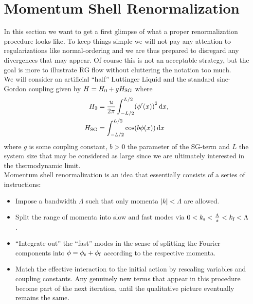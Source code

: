 \documentclass[english, parskip=full]{scrartcl}
\title{\titel}
\author{\autor}
\date{\today}
\begin{document}
\maketitle  %


\section{Momentum Shell Renormalization}
In this section we want to get a first glimpse of what a proper renormalization procedure looks like.
To keep things simple we will not pay any attention to regularizations like normal-ordering and we are thus prepared to disregard any divergences that may appear.
Of course this is not an acceptable strategy, but the goal is more to illustrate RG flow without cluttering the notation too much.\\
We will consider an artificial ``half'' Luttinger Liquid and the standard sine-Gordon coupling given by $H=H_0+g H_{\text{SG}}$ where
\begin{align}
H_0 &= \frac{u}{2\pi} \intx{-L/2}{L/2}{ \kla*{\phi'(x)}^2 }{x},\\
H_\Text{SG} &= \intx{-L/2}{L/2}{ \cos\kla*{b\phi(x)}}{x}
\end{align}
where $g$ is some coupling constant, $b>0$ the parameter of the SG-term and $L$ the system size that may be considered as large since we are ultimately interested in the thermodynamic limit.\\
Momentum shell renormalization is an idea that essentially consists of a series of instructions:
\begin{itemize}
\item[1.] Impose a bandwidth $\Lambda$ such that only momenta $|k|<\Lambda$ are allowed.
\item[2.] Split the range of momenta into slow and fast modes via $0<k_{\text{s}} < \frac{\Lambda}{s} < k_{\text{f}} < \Lambda$.
\item[3.] ``Integrate out'' the ``fast'' modes in the sense of splitting the Fourier components into $\phi = \phi_{\text{s}} + \phi_{\text{f}}$ according to the respective momenta.
\item[4.] Match the effective interaction to the initial action by rescaling variables and coupling constants. Any genuinely new terms that appear in this procedure become part of the next iteration, until the qualitative picture eventually remains the same.
\end{itemize}
\end{document}

